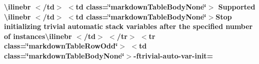 \begin{longtabu}
{\bfseries{{\ttfamily \textbackslash{}ilinebr \texorpdfstring{$<$}{<}/td\texorpdfstring{$>$}{>} \texorpdfstring{$<$}{<}td class=\char`\"{}markdown\+Table\+Body\+None\char`\"{}\texorpdfstring{$>$}{>} Supported \textbackslash{}ilinebr \texorpdfstring{$<$}{<}/td\texorpdfstring{$>$}{>} \texorpdfstring{$<$}{<}td class=\char`\"{}markdown\+Table\+Body\+None\char`\"{}\texorpdfstring{$>$}{>}}Stop initializing trivial automatic stack variables after the specified number of instances{\ttfamily \textbackslash{}ilinebr \texorpdfstring{$<$}{<}/td\texorpdfstring{$>$}{>} \texorpdfstring{$<$}{<}/tr\texorpdfstring{$>$}{>} \texorpdfstring{$<$}{<}tr class=\char`\"{}markdown\+Table\+Row\+Odd\char`\"{}\texorpdfstring{$>$}{>} \texorpdfstring{$<$}{<}td class=\char`\"{}markdown\+Table\+Body\+None\char`\"{}\texorpdfstring{$>$}{>}}-\/ftrivial-\/auto-\/var-\/init=}}


\end{longtabu}
